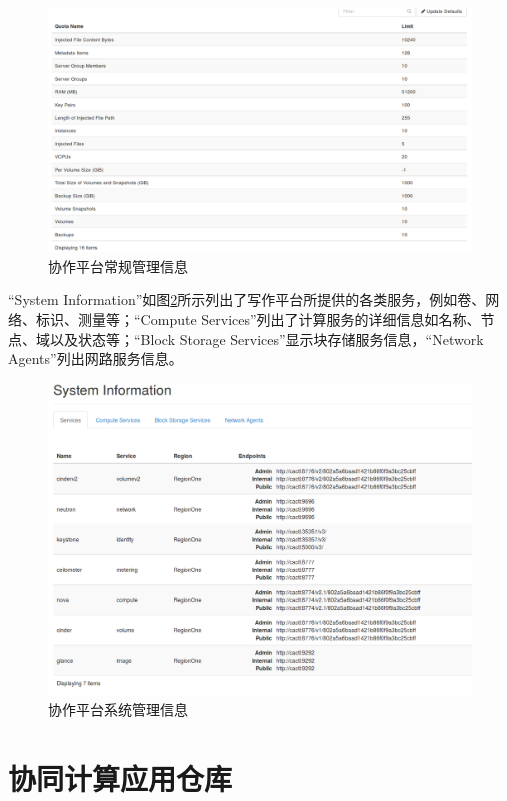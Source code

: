 \documentclass[12pt]{ctexart}%
\begin{document}
\begin{figure}[!htb]
\centering
\includegraphics[width=6in]{./figures/Admin_System_Defaults}
\caption{协作平台常规管理信息}
\label{fig:adminsystemdefaults}
\end{figure}

``System Information''如图\ref{fig:adminsystemsysteminformation}所示列出了写作平台所提供的各类服务，例如卷、网络、标识、测量等；``Compute Services''列出了计算服务的详细信息如名称、节点、域以及状态等；``Block Storage Services''显示块存储服务信息，``Network Agents''列出网路服务信息。
\begin{figure}[!htb]
\centering
\includegraphics[width=6in]{./figures/Admin_System_SystemInformation}
\caption{协作平台系统管理信息}
\label{fig:adminsystemsysteminformation}
\end{figure}
\section{协同计算应用仓库} 
\end{document}
